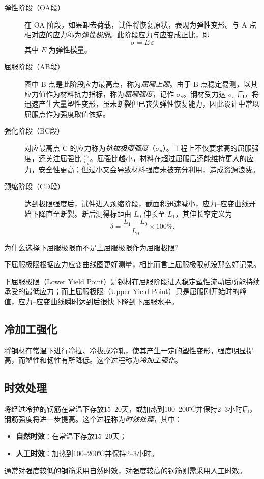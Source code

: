\documentclass[12pt, a4paper, oneside, UTF8]{ctexbook}
\begin{document}
\begin{description}

  \item[弹性阶段（OA段）]
    在 OA 阶段，如果卸去荷载，试件将恢复原状，表现为弹性变形。与 A 点相对应的应力称为\emph{弹性极限}。此阶段应力与应变成正比，即
    \[
      \sigma = E \,\varepsilon
    \]
    其中 $E$ 为弹性模量。

  \item[屈服阶段（AB段）]
    图中 B 点是此阶段应力最高点，称为\emph{屈服上限}。由于 B 点稳定易测，以其应力值作为材料抗力指标，称为\emph{屈服强度}，记作 $\sigma_s$。钢材受力达 $\sigma_s$ 后，将迅速产生大量塑性变形，虽未断裂但已丧失弹性恢复能力，因此设计中常以屈服点作为强度取值依据。

  \item[强化阶段（BC段）]
    对应最高点 C 的应力称为\emph{抗拉极限强度}（$\sigma_u$）。工程上不仅要求高的屈服强度，还关注屈强比 $\displaystyle \frac{\sigma_s}{\sigma_u}$。屈强比越小，材料在超过屈服后还能维持更大的应力，安全性更高；但过小又会导致材料强度未被充分利用，造成资源浪费。

  \item[颈缩阶段（CD段）]
    达到极限强度后，试件进入颈缩阶段，截面积迅速减小，应力–应变曲线开始下降直至断裂。断后测得标距由 $L_0$ 伸长至 $L_1$，其伸长率定义为
    \[
      \delta = \frac{L_1 - L_0}{L_0} \times 100\%.
    \]

\end{description}

\begin{remark}
	为什么选择下屈服极限而不是上屈服极限作为屈服极限?

	下屈服极限根据应力应变曲线图更好测量，相比而言上屈服极限就没那么好记录。

	下屈服极限（Lower Yield Point）是钢材在屈服阶段进入稳定塑性流动后所能持续承受的最低应力；而上屈服极限（Upper Yield Point）只是屈服刚开始时的峰值，应力–应变曲线瞬时达到后很快下降到下屈服水平。
\end{remark}

\subsection*{冷加工强化}
将钢材在常温下进行冷拉、冷拔或冷轧，使其产生一定的塑性变形，强度明显提高，而塑性和韧性有所降低。这个过程称为\emph{冷加工强化}。

\subsection*{时效处理}
将经过冷拉的钢筋在常温下存放15–20天，或加热到100–200℃并保持2–3小时后，钢筋强度将进一步提高。这个过程称为\emph{时效处理}，其中：
\begin{itemize}
  \item \textbf{自然时效}：在常温下存放15–20天；
  \item \textbf{人工时效}：加热到100–200℃并保持2–3小时。
\end{itemize}
通常对强度较低的钢筋采用自然时效，对强度较高的钢筋则需采用人工时效。
\end{document}
